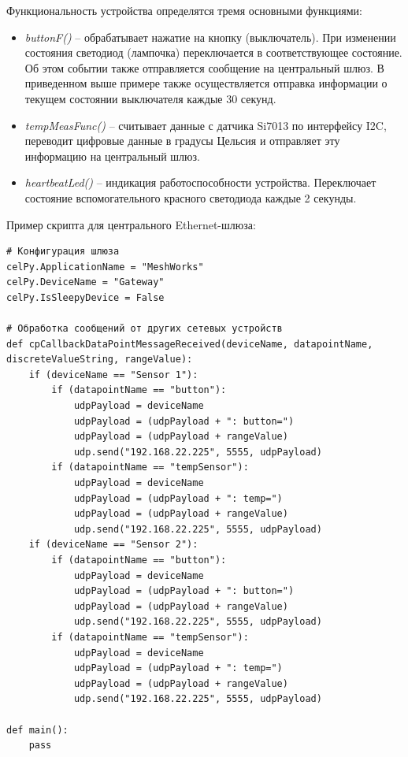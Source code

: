 \documentclass[11pt]{article}
\begin{document}
Функциональность устройства определятся тремя основными функциями:
\begin{itemize}
    \item \emph{buttonF()} -- обрабатывает нажатие на кнопку (выключатель). При 
    изменении состояния светодиод (лампочка) переключается в соответствующее состояние.
    Об этом событии также отправляется сообщение на центральный шлюз. В приведенном
    выше примере также осуществляется отправка информации о текущем состоянии выключателя
    каждые 30 секунд.
    \item \emph{tempMeasFunc()} -- считывает данные с датчика
    Si7013 по интерфейсу I2C, переводит цифровые данные в градусы Цельсия и 
    отправляет эту информацию на центральный шлюз.
    \item \emph{heartbeatLed()} -- индикация работоспособности устройства. Переключает
    состояние вспомогательного красного светодиода каждые 2 секунды.
\end{itemize}

Пример скрипта для центрального Ethernet-шлюза:
\begin{verbatim}
# Конфигурация шлюза
celPy.ApplicationName = "MeshWorks"
celPy.DeviceName = "Gateway"
celPy.IsSleepyDevice = False

# Обработка сообщений от других сетевых устройств
def cpCallbackDataPointMessageReceived(deviceName, datapointName, discreteValueString, rangeValue):
    if (deviceName == "Sensor 1"):
        if (datapointName == "button"):
            udpPayload = deviceName
            udpPayload = (udpPayload + ": button=")
            udpPayload = (udpPayload + rangeValue)
            udp.send("192.168.22.225", 5555, udpPayload)
        if (datapointName == "tempSensor"): 
            udpPayload = deviceName
            udpPayload = (udpPayload + ": temp=")
            udpPayload = (udpPayload + rangeValue)
            udp.send("192.168.22.225", 5555, udpPayload) 
    if (deviceName == "Sensor 2"):
        if (datapointName == "button"):
            udpPayload = deviceName
            udpPayload = (udpPayload + ": button=")
            udpPayload = (udpPayload + rangeValue)
            udp.send("192.168.22.225", 5555, udpPayload)
        if (datapointName == "tempSensor"): 
            udpPayload = deviceName
            udpPayload = (udpPayload + ": temp=") 
            udpPayload = (udpPayload + rangeValue)
            udp.send("192.168.22.225", 5555, udpPayload)  
   
def main(): 
    pass

\end{verbatim}
\end{document}
